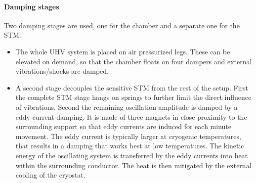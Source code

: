 \paragraph{Damping stages}
Two damping stages are used, one for the chamber and a separate one for the STM.
\begin{itemize}
	\item The whole UHV system is placed on air pressurized legs. These can be elevated on demand, so that the chamber floats on four dampers and external vibrations/shocks are damped.
	\item A second stage decouples the sensitive STM from the rest of the setup. First the complete STM stage hangs on springs to further limit the direct influence of vibrations. Second the remaining oscillation amplitude is damped by a eddy current damping. It is made of three magnets in close proximity to the surrounding support so that eddy currents are induced for each minute movement. The eddy current is typically larger at cryogenic temperatures, that results in a damping that works best at low temperatures. The kinetic energy of the oscillating system is transferred by the eddy currents into heat within the surrounding conductor. The heat is then mitigated by the external cooling of the cryostat.
\end{itemize}